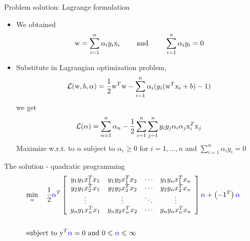 


\begin{frame}{Problem solution: Lagrange formulation}
\begin{itemize}
\item We obtained
\[ {\rm w} = \sum\limits_{i = 1}^n {{\alpha _i}{y_i}{{\rm x}_i}}    ~~~~~~~ \text{and} ~~~~~~~    \sum\limits_{i = 1}^n {{\alpha _i}{y_i} = 0} \]
\item Substitute in Lagrangian optimization problem,
\[\mathcal{L}({\rm w},b,\alpha ) = \frac{1}{2}{{\rm w}^T}{\rm w} - \sum\limits_{i = 1}^n {{\alpha _i}({y_i}({{\rm w}^T}{{\rm x}_i} + b) - 1)} \]
 we get
 \[\mathcal{L}(\alpha ) = \sum_{n=1}^{n}\alpha_n -\frac{1}{2}\sum_{i=1}^{n} \sum\limits_{j= 1}^n y_iy_j\alpha_i\alpha_j {\rm x}_i^T{\rm x}_j\]
 Maximize w.r.t. to $\alpha$ subject to $\alpha_i\geq 0$ for $i=1,\ldots,n$ and $\sum_{i=1}^n\alpha_iy_i =0$
\end{itemize}
\end{frame}

\begin{frame}{The solution - quadratic programming}
\[\begin{gathered}
  \mathop {\min }\limits_{\color{blue}\alpha}  ~~~ \frac{1}{2}{{\color{blue}\alpha}  ^T}\left[ {\begin{array}{*{20}{c}}
  {{y_1}{y_1}x_1^T{x_1}}&{{y_1}{y_2}x_1^T{x_2}}&{\cdots}&{{y_1}{y_n}x_1^T{x_n}} \\ 
  {{y_2}{y_1}x_2^T{x_1}}&{{y_2}{y_2}x_2^T{x_2}}&{\cdots}&{{y_2}{y_n}x_2^T{x_n}} \\ 
  {\vdots}&{\vdots}&{\ddots}&{\vdots} \\ 
  {{y_n}{y_1}x_n^T{x_1}}&{{y_n}{y_2}x_n^T{x_2}}&{\cdots}&{{y_n}{y_n}x_n^T{x_n}} 
\end{array}} \right]{\color{blue}\alpha}  + \left( { - {1^T}} \right){\color{blue}\alpha}  \hfill \\\\
  \text{subject to   }{{\rm y}^T}{\color{blue}\alpha}   = 0\text{   and   }0 \leqslant {\color{blue}\alpha}   \leqslant \infty  \hfill \\ 
\end{gathered} \]
\end{frame}

